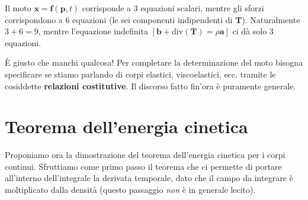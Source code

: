 \documentclass[10pt,a4paper,twoside]{book}
\begin{document}
Il moto $\mathbf{x} =\mathbf{f}(\mathbf{p} ,t)$ corrisponde a $3$ equazioni scalari, mentre gli sforzi corrispondono a $6$ equazioni (le sei componenti indipendenti di $\mathbf{T}$). Naturalmente $3+6=9$, mentre l'equazione indefinita $[\mathbf{b} +\mathrm{div}(\mathbf{T}) =\rho \mathbf{a}]$ ci dà solo $3$ equazioni.

È giusto che manchi qualcosa! Per completare la determinazione del moto bisogna specificare se stiamo parlando di corpi elastici, viscoelastici, ecc. tramite le cosiddette \textbf{relazioni costitutive}. Il discorso fatto fin'ora è puramente generale.
\section{Teorema dell'energia cinetica}

Proponiamo ora la dimostrazione del teorema dell'energia cinetica per i corpi continui. Sfruttiamo come primo passo il teorema che ci permette di portare all'interno dell'integrale la derivata temporale, dato che il campo da integrare è moltiplicato dalla densità (questo passaggio \textit{non} è in generale lecito).
\end{document}

